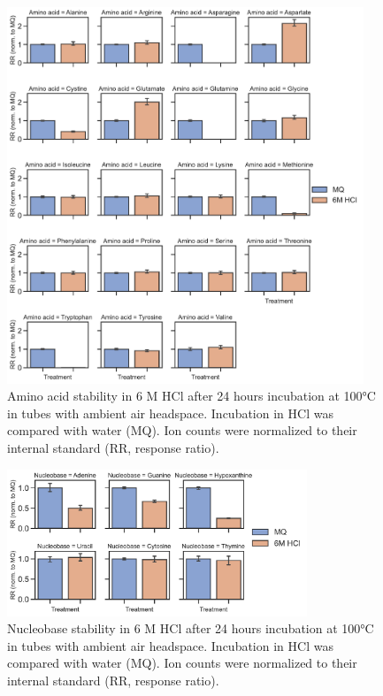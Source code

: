 \begin{figure}[ht]
    \centering
    \includegraphics[width=0.95\textwidth]{figures/chap2/app/AA_acid_hydrolysis_stability.pdf}
    \caption[Amino acid stability in HCl.]{
    Amino acid stability in 6 M HCl after 24 hours incubation at 100°C in tubes with ambient air headspace.
    Incubation in HCl was compared with water (MQ).
    Ion counts were normalized to their internal standard (RR, response ratio).
    }
    \label{fig:app_ch2:AA_acid_hydrolysis_stability}
\end{figure}

\begin{figure}[ht]
    \centering
    \includegraphics[width=0.8\textwidth]{figures/chap2/app/nucleobase_hydrolysis_stability.pdf}
    \caption[Nucleobase stability in HCl.]{
    Nucleobase stability in 6 M HCl after 24 hours incubation at 100°C in tubes with ambient air headspace.
    Incubation in HCl was compared with water (MQ).
    Ion counts were normalized to their internal standard (RR, response ratio).
    }
    \label{fig:app_ch2:nucleobase_hydrolysis_stability}
\end{figure}

